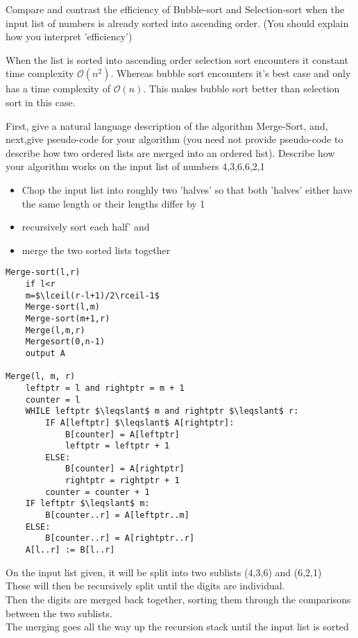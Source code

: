 \documentclass[addpoints]{exam}
\begin{document}
\begin{questions}
\question[6]Compare and contrast the efficiency of Bubble-sort and Selection-sort when the input list of numbers is already sorted into ascending order. (You should explain how you interpret 'efficiency')
\begin{solution}[2in]
When the list is sorted into ascending order selection sort encounters it constant time complexity $\mathcal{O}(n^2)$. Whereas bubble sort encounters it's best case and only has a time complexity of $\mathcal{O}(n)$. This makes bubble sort better than selection sort in this case.
\end{solution}
\newpage
\question[14]First, give a natural language description of the algorithm Merge-Sort, and, next,give pseudo-code for your algorithm (you need not provide pseudo-code to describe how two ordered lists are merged into an ordered list). Describe how your algorithm works on the input list of numbers 4,3,6,6,2,1
\begin{solution}[2in]
	\begin{itemize}
		\item Chop the input list into roughly two 'halves' so that both 'halves' either have the same length or their lengths differ by 1
		\item recursively sort each half' and
		\item merge the two sorted lists together
	\end{itemize}
\begin{lstlisting}[mathescape=true]
Merge-sort(l,r)
	if l<r
	m=$\lceil(r-l+1)/2\rceil-1$
	Merge-sort(l,m)
	Merge-sort(m+1,r)
	Merge(l,m,r)
	Mergesort(0,n-1)
	output A
	
Merge(l, m, r)
	leftptr = l and rightptr = m + 1
	counter = l
	WHILE leftptr $\leqslant$ m and rightptr $\leqslant$ r:
		IF A[leftptr] $\leqslant$ A[rightptr]:
			B[counter] = A[leftptr]
			leftptr = leftptr + 1
		ELSE:
			B[counter] = A[rightptr]
			rightptr = rightptr + 1
		counter = counter + 1
	IF leftptr $\leqslant$ m:
		B[counter..r] = A[leftptr..m]
	ELSE:
		B[counter..r] = A[rightptr..r]
	A[l..r] := B[l..r]
\end{lstlisting}
On the input list given, it will be split into two sublists (4,3,6) and (6,2,1)\\
These will then be recursively split until the digits are individual.\\
Then the digits are merged back together, sorting them through the comparisons between the two sublists.\\
The merging goes all the way up the recursion stack until the input list is sorted
\end{solution}


\end{questions}
\end{document}
